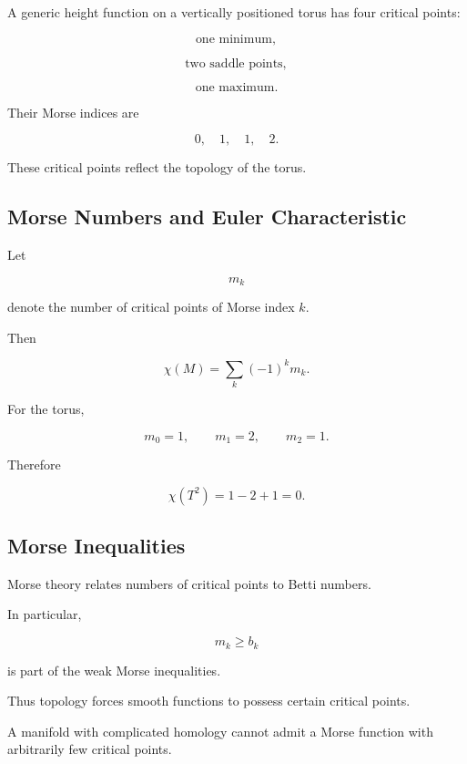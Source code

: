 A generic height function on a vertically positioned torus has four critical
points:

\[
\boxed{
\text{one minimum},
}
\]

\[
\boxed{
\text{two saddle points},
}
\]

\[
\boxed{
\text{one maximum}.
}
\]

Their Morse indices are

\[
\boxed{
0,\quad1,\quad1,\quad2.
}
\]

These critical points reflect the topology of the torus.

\subsection{Morse Numbers and Euler Characteristic}
\label{subsec:morse-euler}

Let

\[
m_k
\]

denote the number of critical points of Morse index \(k\).

Then

\[
\boxed{
\chi(M)
=
\sum_k(-1)^k m_k.
}
\]

For the torus,

\[
m_0=1,
\qquad
m_1=2,
\qquad
m_2=1.
\]

Therefore

\[
\boxed{
\chi(T^2)
=
1-2+1
=
0.
}
\]

\subsection{Morse Inequalities}
\label{subsec:morse-inequalities}

Morse theory relates numbers of critical points to Betti numbers.

In particular,

\[
\boxed{
m_k\geq b_k
}
\]

is part of the weak Morse inequalities.

Thus topology forces smooth functions to possess certain critical points.

A manifold with complicated homology cannot admit a Morse function with
arbitrarily few critical points.

